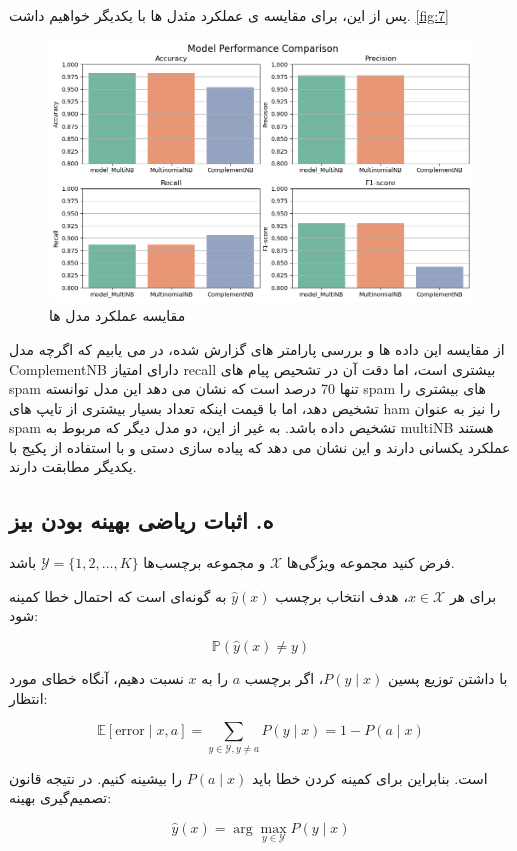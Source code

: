 \documentclass{article}
\begin{document}
\clearpage
پس از این، برای مقایسه ی عملکرد مئدل ها با یکدیگر خواهیم داشت. \autoref{fig:7}
\begin{figure}
    \centering
    \includegraphics[width=0.75\linewidth]{7.png}
    \caption{مقایسه عملکرد مدل ها}
    \label{fig:7}
\end{figure}

از مقایسه این داده ها و بررسی پارامتر های گزارش شده، در می یابیم که اگرچه مدل ComplementNB دارای امتیاز recall بیشتری است، اما دقت آن در تشحیص پیام های spam تنها 70 درصد است که نشان می دهد این مدل توانسته spam های بیشتری را تشخیص دهد، اما با قیمت اینکه تعداد بسیار بیشتری از تایپ های ham را نیز به عنوان spam تشخیص داده باشد.
به غیر از این، دو مدل دیگر که مربوط به multiNB هستند عملکرد یکسانی دارند و این نشان می دهد که پیاده سازی دستی و با استفاده از پکیج با یکدیگر مطابقت دارند.

\clearpage

\subsection{ه. اثبات ریاضی بهینه بودن بیز}
فرض کنید مجموعه ویژگی‌ها $\mathcal{X}$ و مجموعه برچسب‌ها $\mathcal{Y} = \{1, 2, \dots, K\}$ باشد.

برای هر $x \in \mathcal{X}$، هدف انتخاب برچسب $\hat{y}(x)$ به گونه‌ای است که احتمال خطا کمینه شود:

\[
\mathbb{P}(\hat{y}(x) \neq y)
\]

با داشتن توزیع پسین $P(y \mid x)$، اگر برچسب $a$ را به $x$ نسبت دهیم، آنگاه خطای مورد انتظار:

\[
\mathbb{E}[\text{error} \mid x, a] = \sum_{y \in \mathcal{Y}, y \neq a} P(y \mid x) = 1 - P(a \mid x)
\]

است. بنابراین برای کمینه کردن خطا باید $P(a \mid x)$ را بیشینه کنیم. در نتیجه قانون تصمیم‌گیری بهینه:

\[
\hat{y}(x) = \arg\max_{y \in \mathcal{Y}} P(y \mid x)
\]
\end{document}
